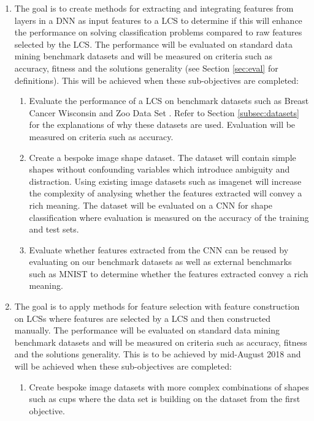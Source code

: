 \begin{enumerate}
	\item  The goal is to create methods for extracting and integrating features from layers in a DNN as input features to a LCS to determine if this will enhance the performance on solving classification problems compared to raw features selected by the LCS. The performance will be evaluated on standard data mining benchmark datasets and will be measured on criteria such as accuracy, fitness and the solution\textquotesingle s generality (see Section \ref{sec:eval} for definitions). This will be achieved when these sub-objectives are completed:
	
	\begin{enumerate}
		\item Evaluate the performance of a LCS on benchmark datasets such as Breast Cancer Wisconsin \cite{wisconsinbreast} and Zoo Data Set \cite{zoodata}. Refer to Section \ref{subsec:datasets} for the explanations of why these datasets are used. Evaluation will be measured on criteria such as accuracy.
		\item Create a bespoke image shape dataset. The dataset will contain simple shapes without confounding variables which introduce ambiguity and distraction. Using existing image datasets such as imagenet \cite{imagenet} will increase the complexity of analysing whether the features extracted will convey a rich meaning. The dataset will be evaluated on a CNN for shape classification where evaluation is measured on the accuracy of the training and test sets.
		\item Evaluate whether features extracted from the CNN can be reused by evaluating on our benchmark datasets as well as external benchmarks such as MNIST to determine whether the features extracted convey a rich meaning.
		
	\end{enumerate}
	
	\item  The goal is to apply methods for feature selection with feature construction on LCSs where features are selected by a LCS and then constructed manually. The performance will be evaluated on standard data mining benchmark datasets and will be measured on criteria such as accuracy, fitness and the solution\textquotesingle s generality. This is to be achieved by mid-August 2018 and will be achieved when these sub-objectives are completed:
	\begin{enumerate}
		\item Create bespoke image datasets with more complex combinations of shapes such as cups where the data set is building on the dataset from the first objective.
		

\end{enumerate}
\end{enumerate}
